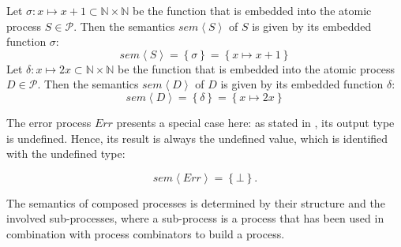 \begin{example}
  \label{exp:sem_atomic}
  Let $\sigma \colon x \mapsto x+1 \subset \mathbb{N} \times \mathbb{N}$ be the function that is embedded into the atomic process $S \in \mathcal{P}$. Then the semantics $sem \left\langle S \right\rangle$ of $S$ is given by its embedded function $\sigma$:
  \begin{equation}
    sem \left\langle S \right\rangle = \left\{ \sigma \right\} = \left\{ x \mapsto x+1 \right\}
  \end{equation}
  Let $\delta \colon x \mapsto 2x \subset \mathbb{N} \times \mathbb{N}$ be the function that is embedded into the atomic process $D \in \mathcal{P}$. Then the semantics $sem \left\langle D \right\rangle$ of $D$ is given by its embedded function $\delta$:
  \begin{equation}
    sem \left\langle D \right\rangle = \left\{ \delta \right\} = \left\{ x \mapsto 2x \right\}
  \end{equation}
  \hfill\qedsymbol
\end{example}

The error process $Err$ presents a special case here: as stated in , its output type is undefined. Hence, its result is always the undefined value, which is identified with the undefined type:
\begin{definition}
  \begin{equation}
    \label{eqn:sem_error}
    sem \left\langle Err \right\rangle = \left\{ \bot \right\}.
  \end{equation}
  \hfill\qedsymbol
\end{definition}


The semantics of composed processes is determined by their structure and the involved sub-processes, where a sub-process is a process that has been used in combination with process combinators to build a process. 

